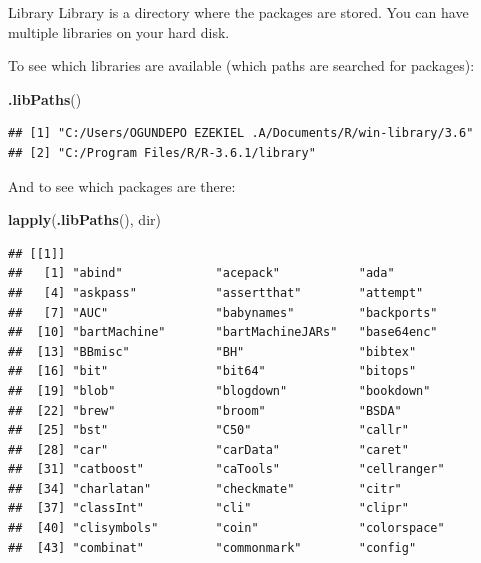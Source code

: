 \documentclass[
  ignorenonframetext,
]{beamer}
\newenvironment{Shaded}{\begin{snugshade}}{\end{snugshade}}
\newcommand{\KeywordTok}[1]{\textcolor[rgb]{0.13,0.29,0.53}{\textbf{#1}}}
\newcommand{\NormalTok}[1]{#1}
\begin{document}
\begin{frame}[fragile]{Library}
\protect\hypertarget{library}{}
\pause
Library is a directory where the packages are stored. You can have
multiple libraries on your hard disk. \pause

To see which libraries are available (which paths are searched for
packages): \pause

\begin{Shaded}
\begin{Highlighting}[]
\KeywordTok{.libPaths}\NormalTok{()}
\end{Highlighting}
\end{Shaded}

\begin{verbatim}
## [1] "C:/Users/OGUNDEPO EZEKIEL .A/Documents/R/win-library/3.6"
## [2] "C:/Program Files/R/R-3.6.1/library"
\end{verbatim}

\end{frame}

\begin{frame}[fragile]{}
\protect\hypertarget{section}{}
And to see which packages are there: \pause
\begin{Shaded}
\begin{Highlighting}[]
\KeywordTok{lapply}\NormalTok{(}\KeywordTok{.libPaths}\NormalTok{(), dir)}
\end{Highlighting}
\end{Shaded}

\begin{verbatim}
## [[1]]
##   [1] "abind"             "acepack"           "ada"              
##   [4] "askpass"           "assertthat"        "attempt"          
##   [7] "AUC"               "babynames"         "backports"        
##  [10] "bartMachine"       "bartMachineJARs"   "base64enc"        
##  [13] "BBmisc"            "BH"                "bibtex"           
##  [16] "bit"               "bit64"             "bitops"           
##  [19] "blob"              "blogdown"          "bookdown"         
##  [22] "brew"              "broom"             "BSDA"             
##  [25] "bst"               "C50"               "callr"            
##  [28] "car"               "carData"           "caret"            
##  [31] "catboost"          "caTools"           "cellranger"       
##  [34] "charlatan"         "checkmate"         "citr"             
##  [37] "classInt"          "cli"               "clipr"            
##  [40] "clisymbols"        "coin"              "colorspace"       
##  [43] "combinat"          "commonmark"        "config"           
\end{verbatim}

\end{frame}
\end{document}
